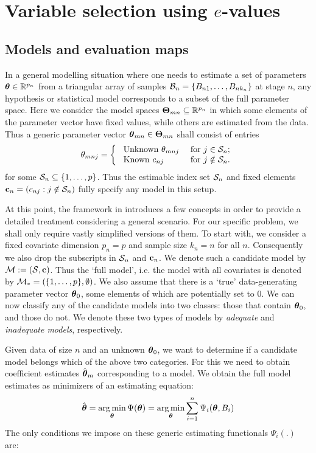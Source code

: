 \section{Variable selection using $e$-values}
\label{sec:methodsSection}

\subsection{Models and evaluation maps}

In a general modelling situation where one needs to estimate a set of parameters ${\boldsymbol{\theta}} \in {\mathbb{R}}^{p_n}$ from a triangular array of samples ${\cal{B}}_n = \{ B_{n1}, \ldots, B_{n k_n} \}$ at stage $n$, any hypothesis or statistical model corresponds to a subset of the full parameter space. Here we consider the model spaces ${\boldsymbol{\Theta}}_{mn} \subseteq {\mathbb{R}}^{p_n}$ in which some elements of the parameter vector have fixed values, while others are estimated from the data. Thus a generic parameter vector ${\boldsymbol{\theta}}_{mn} \in {\boldsymbol{\Theta}}_{mn}$ shall consist of entries
%
$$
\theta_{m n j} = \left\{ \begin{array}{ll}
\text{ Unknown } \theta_{m n j} & \text{ for } 
			j \in {\cal{S}}_{n}; \\
\text{ Known } c_{nj} & \text{ for } j \notin {\cal{S}}_{n}.
\end{array}
\right.
$$
%
for some ${\cal{S}}_n \subseteq \{ 1, \ldots, p \}$. Thus the estimable index set ${\cal{S}}_n$ and fixed elements ${\bf{c}}_n = (c_{n j} : j \notin {\cal{S}}_n)$ fully specify any model in this setup.

At this point, the framework in \cite{MajumdarChatterjee17} introduces a few concepts in order to provide a detailed treatment considering a general scenario. For our specific problem, we shall only require vastly simplified versions of them. To start with, we consider a fixed covariate dimension $p_n = p$ and sample size $k_n = n$ for all $n$. Consequently we also drop the subscripts in ${\cal{S}}_n$ and ${\bf{c}}_n$. We denote such a candidate model by ${\cal{M}} := ({\cal{S}},{\bf{c}})$. Thus the `full model', i.e. the model with all covariates is denoted by ${\cal{M}}_* = (\{ 1, \ldots, p \}, \emptyset)$. We also assume that there is a `true' data-generating parameter vector ${\boldsymbol{\theta}}_0$, some elements of which are potentially set to 0. We can now classify any of the candidate models into two classes: those that contain ${\boldsymbol{\theta}}_0$, and those do not. We denote these two types of models by \textit{adequate} and \textit{inadequate models}, respectively.

Given data of size $n$ and an unknown ${\boldsymbol{\theta}}_0$, we want to determine if a candidate model belongs which of the above two categories. For this we need to obtain coefficient estimates $\hat {{\boldsymbol{\theta}}}_m$ corresponding to a model. We obtain the full model estimates as minimizers of an estimating equation:
%
\begin{align}\label{eqn:EstEqn}
\hat {{\boldsymbol{\theta}}} = \operatorname*{arg\,min}_{ {\boldsymbol{\theta}}} \Psi ({\boldsymbol{\theta}}) = \operatorname*{arg\,min}_{ {\boldsymbol{\theta}} } \sum_{i=1}^n \Psi_i ({\boldsymbol{\theta}}, B_i)
\end{align}
%
The only conditions we impose on these generic estimating functionals $\Psi_i(.)$ are:

